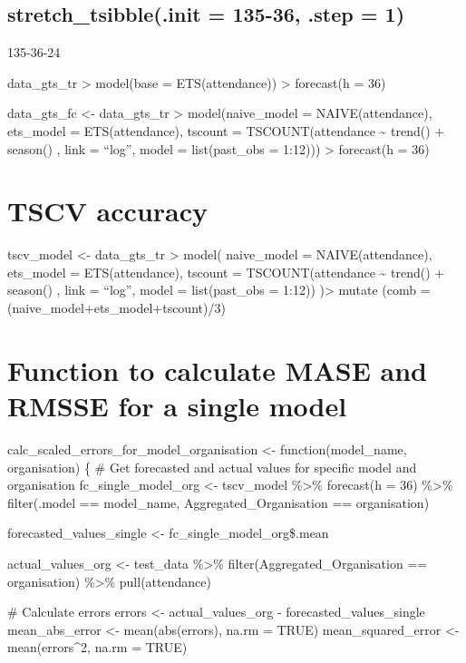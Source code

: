\documentclass[
]{article}
\begin{document}
\hypertarget{stretch_tsibble.init-135-36-.step-1}{%
\subsection{stretch\_tsibble(.init = 135-36, .step = 1)}\label{stretch_tsibble.init-135-36-.step-1}}

135-36-24

data\_gts\_tr \textbar\textgreater{}
model(base = ETS(attendance)) \textbar\textgreater{}
forecast(h = 36)

data\_gts\_fc \textless- data\_gts\_tr \textbar\textgreater{}
model(naive\_model = NAIVE(attendance),
ets\_model = ETS(attendance),
tscount = TSCOUNT(attendance \textasciitilde{} trend() + season() , link = ``log'', model = list(past\_obs = 1:12))) \textbar\textgreater{}
forecast(h = 36)

\hypertarget{tscv-accuracy}{%
\section{TSCV accuracy}\label{tscv-accuracy}}

tscv\_model \textless- data\_gts\_tr \textbar\textgreater{}
model(
naive\_model = NAIVE(attendance),
ets\_model = ETS(attendance),
tscount = TSCOUNT(attendance \textasciitilde{} trend() + season() , link = ``log'', model = list(past\_obs = 1:12))
)\textbar\textgreater{} mutate (comb = (naive\_model+ets\_model+tscount)/3)

\hypertarget{function-to-calculate-mase-and-rmsse-for-a-single-model}{%
\section{Function to calculate MASE and RMSSE for a single model}\label{function-to-calculate-mase-and-rmsse-for-a-single-model}}

calc\_scaled\_errors\_for\_model\_organisation \textless- function(model\_name, organisation) \{
\# Get forecasted and actual values for specific model and organisation
fc\_single\_model\_org \textless- tscv\_model \%\textgreater\%
forecast(h = 36) \%\textgreater\%
filter(.model == model\_name, Aggregated\_Organisation == organisation)

forecasted\_values\_single \textless- fc\_single\_model\_org\$.mean

actual\_values\_org \textless- test\_data \%\textgreater\%
filter(Aggregated\_Organisation == organisation) \%\textgreater\%
pull(attendance)

\# Calculate errors
errors \textless- actual\_values\_org - forecasted\_values\_single
mean\_abs\_error \textless- mean(abs(errors), na.rm = TRUE)
mean\_squared\_error \textless- mean(errors\^{}2, na.rm = TRUE)
\end{document}
